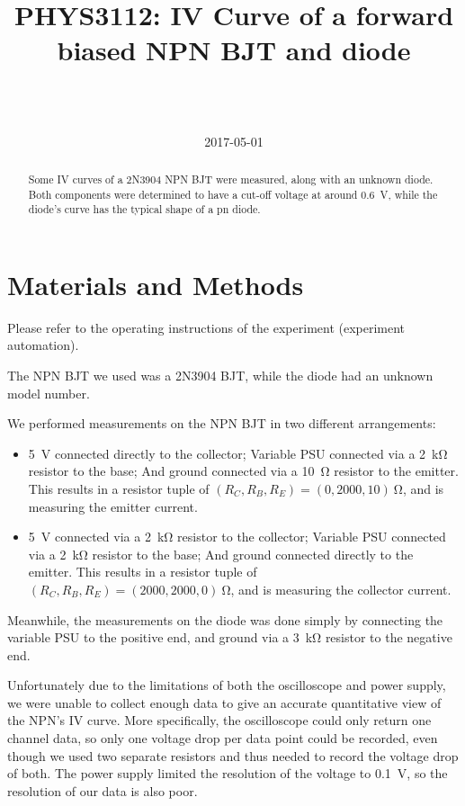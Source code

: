 \documentclass[a4paper]{scrartcl}
\begin{document}
\title{PHYS3112: IV Curve of a forward biased NPN BJT and diode}
\author{ \\ \\ }
\date{2017-05-01}
\maketitle

\begin{abstract}
    Some IV curves of a 2N3904 NPN BJT were measured, along with an unknown diode. Both components were determined to have a cut-off voltage at around \SI{0.6}{\volt}, while the diode's curve has the typical shape of a pn diode.
\end{abstract}

\section{Materials and Methods}
Please refer to the operating instructions of the experiment (experiment automation).

The NPN BJT we used was a 2N3904 BJT, while the diode had an unknown model number.

We performed measurements on the NPN BJT in two different arrangements:
\begin{itemize}
    \item \SI{+5}{\volt} connected directly to the collector; Variable PSU connected via a \SI{2}{\kilo\ohm} resistor to the base; And ground connected via a \SI{10}{\ohm} resistor to the emitter. This results in a resistor tuple of \((R_C, R_B, R_E) = (0, 2000, 10) \:\si{\ohm}\), and is measuring the emitter current.
    \item \SI{+5}{\volt} connected via a \SI{2}{\kilo\ohm} resistor to the collector; Variable PSU connected via a \SI{2}{\kilo\ohm} resistor to the base; And ground connected directly to the emitter. This results in a resistor tuple of \((R_C, R_B, R_E) = (2000, 2000, 0) \:\si{\ohm}\), and is measuring the collector current.
\end{itemize}

Meanwhile, the measurements on the diode was done simply by connecting the variable PSU to the positive end, and ground via a \SI{3}{\kilo\ohm} resistor to the negative end.

Unfortunately due to the limitations of both the oscilloscope and power supply, we were unable to collect enough data to give an accurate quantitative view of the NPN's IV curve. More specifically, the oscilloscope could only return one channel data, so only one voltage drop per data point could be recorded, even though we used two separate resistors and thus needed to record the voltage drop of both. The power supply limited the resolution of the voltage to \SI{0.1}{\volt}, so the resolution of our data is also poor.
\end{document}
